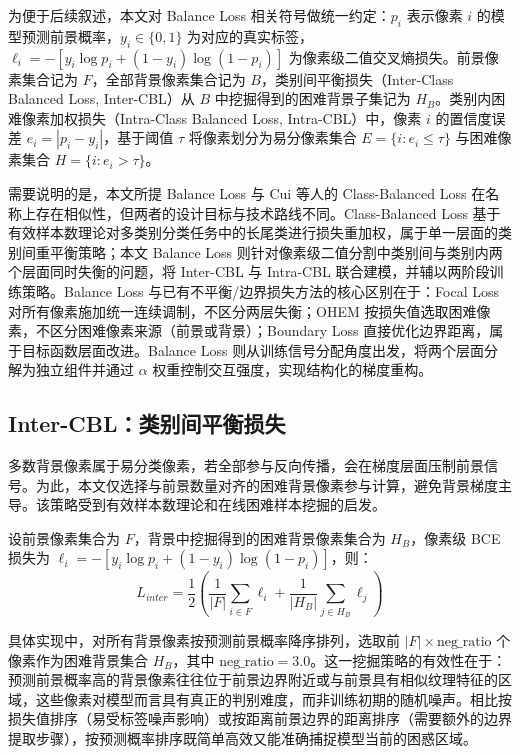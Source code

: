 为便于后续叙述，本文对 Balance Loss 相关符号做统一约定：$p_i$ 表示像素 $i$ 的模型预测前景概率，$y_i \in \{0,1\}$ 为对应的真实标签，$\ell_i = -[y_i \log p_i + (1-y_i)\log(1-p_i)]$ 为像素级二值交叉熵损失。前景像素集合记为 $F$，全部背景像素集合记为 $B$，类别间平衡损失（Inter-Class Balanced Loss, Inter-CBL）从 $B$ 中挖掘得到的困难背景子集记为 $H_B$。类别内困难像素加权损失（Intra-Class Balanced Loss, Intra-CBL）中，像素 $i$ 的置信度误差 $e_i = |p_i - y_i|$，基于阈值 $\tau$ 将像素划分为易分像素集合 $E = \{i : e_i \leq \tau\}$ 与困难像素集合 $H = \{i : e_i > \tau\}$。

需要说明的是，本文所提 Balance Loss 与 Cui 等人\cite{cui2019classbalanced}的 Class-Balanced Loss 在名称上存在相似性，但两者的设计目标与技术路线不同。Class-Balanced Loss 基于有效样本数理论对多类别分类任务中的长尾类进行损失重加权，属于单一层面的类别间重平衡策略；本文 Balance Loss 则针对像素级二值分割中类别间与类别内两个层面同时失衡的问题，将 Inter-CBL 与 Intra-CBL 联合建模，并辅以两阶段训练策略。Balance Loss 与已有不平衡/边界损失方法的核心区别在于：Focal Loss 对所有像素施加统一连续调制，不区分两层失衡；OHEM 按损失值选取困难像素，不区分困难像素来源（前景或背景）；Boundary Loss 直接优化边界距离，属于目标函数层面改进。Balance Loss 则从训练信号分配角度出发，将两个层面分解为独立组件并通过 $\alpha$ 权重控制交互强度，实现结构化的梯度重构。

\subsection{Inter-CBL：类别间平衡损失}

多数背景像素属于易分类像素，若全部参与反向传播，会在梯度层面压制前景信号。为此，本文仅选择与前景数量对齐的困难背景像素参与计算，避免背景梯度主导。该策略受到有效样本数理论\cite{cui2019classbalanced}和在线困难样本挖掘\cite{shrivastava2016ohem}的启发。

设前景像素集合为 $F$，背景中挖掘得到的困难背景像素集合为 $H_B$，像素级 BCE 损失为 $\ell_i = -[y_i \log p_i + (1-y_i)\log(1-p_i)]$，则：
\begin{equation}
L_{inter}=\frac{1}{2}\left(\frac{1}{|F|}\sum_{i\in F}\ell_i+\frac{1}{|H_B|}\sum_{j\in H_B}\ell_j\right)
\end{equation}

具体实现中，对所有背景像素按预测前景概率降序排列，选取前 $|F| \times \text{neg\_ratio}$ 个像素作为困难背景集合 $H_B$，其中 $\text{neg\_ratio}=3.0$。这一挖掘策略的有效性在于：预测前景概率高的背景像素往往位于前景边界附近或与前景具有相似纹理特征的区域，这些像素对模型而言具有真正的判别难度，而非训练初期的随机噪声。相比按损失值排序（易受标签噪声影响）或按距离前景边界的距离排序（需要额外的边界提取步骤），按预测概率排序既简单高效又能准确捕捉模型当前的困惑区域。


